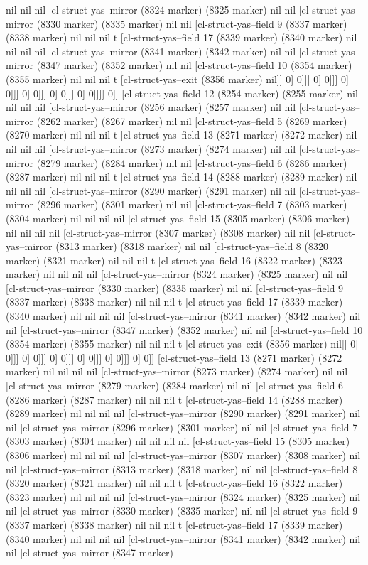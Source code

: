 {{nil nil nil [cl-struct-yas--mirror (8324 marker) (8325 marker) nil nil [cl-struct-yas--mirror (8330 marker) (8335 marker) nil nil [cl-struct-yas--field 9 (8337 marker) (8338 marker) nil nil nil t [cl-struct-yas--field 17 (8339 marker) (8340 marker) nil nil nil nil [cl-struct-yas--mirror (8341 marker) (8342 marker) nil nil [cl-struct-yas--mirror (8347 marker) (8352 marker) nil nil [cl-struct-yas--field 10 (8354 marker) (8355 marker) nil nil nil t [cl-struct-yas--exit (8356 marker) nil]] 0] 0]]] 0] 0]]] 0] 0]]] 0] 0]]] 0] 0]]] 0] 0]]]] 0]] [cl-struct-yas--field 12 (8254 marker) (8255 marker) nil nil nil nil [cl-struct-yas--mirror (8256 marker) (8257 marker) nil nil [cl-struct-yas--mirror (8262 marker) (8267 marker) nil nil [cl-struct-yas--field 5 (8269 marker) (8270 marker) nil nil nil t [cl-struct-yas--field 13 (8271 marker) (8272 marker) nil nil nil nil [cl-struct-yas--mirror (8273 marker) (8274 marker) nil nil [cl-struct-yas--mirror (8279 marker) (8284 marker) nil nil [cl-struct-yas--field 6 (8286 marker) (8287 marker) nil nil nil t [cl-struct-yas--field 14 (8288 marker) (8289 marker) nil nil nil nil [cl-struct-yas--mirror (8290 marker) (8291 marker) nil nil [cl-struct-yas--mirror (8296 marker) (8301 marker) nil nil [cl-struct-yas--field 7 (8303 marker) (8304 marker) nil nil nil nil [cl-struct-yas--field 15 (8305 marker) (8306 marker) nil nil nil nil [cl-struct-yas--mirror (8307 marker) (8308 marker) nil nil [cl-struct-yas--mirror (8313 marker) (8318 marker) nil nil [cl-struct-yas--field 8 (8320 marker) (8321 marker) nil nil nil t [cl-struct-yas--field 16 (8322 marker) (8323 marker) nil nil nil nil [cl-struct-yas--mirror (8324 marker) (8325 marker) nil nil [cl-struct-yas--mirror (8330 marker) (8335 marker) nil nil [cl-struct-yas--field 9 (8337 marker) (8338 marker) nil nil nil t [cl-struct-yas--field 17 (8339 marker) (8340 marker) nil nil nil nil [cl-struct-yas--mirror (8341 marker) (8342 marker) nil nil [cl-struct-yas--mirror (8347 marker) (8352 marker) nil nil [cl-struct-yas--field 10 (8354 marker) (8355 marker) nil nil nil t [cl-struct-yas--exit (8356 marker) nil]] 0] 0]]] 0] 0]]] 0] 0]]] 0] 0]]] 0] 0]]] 0] 0]] [cl-struct-yas--field 13 (8271 marker) (8272 marker) nil nil nil nil [cl-struct-yas--mirror (8273 marker) (8274 marker) nil nil [cl-struct-yas--mirror (8279 marker) (8284 marker) nil nil [cl-struct-yas--field 6 (8286 marker) (8287 marker) nil nil nil t [cl-struct-yas--field 14 (8288 marker) (8289 marker) nil nil nil nil [cl-struct-yas--mirror (8290 marker) (8291 marker) nil nil [cl-struct-yas--mirror (8296 marker) (8301 marker) nil nil [cl-struct-yas--field 7 (8303 marker) (8304 marker) nil nil nil nil [cl-struct-yas--field 15 (8305 marker) (8306 marker) nil nil nil nil [cl-struct-yas--mirror (8307 marker) (8308 marker) nil nil [cl-struct-yas--mirror (8313 marker) (8318 marker) nil nil [cl-struct-yas--field 8 (8320 marker) (8321 marker) nil nil nil t [cl-struct-yas--field 16 (8322 marker) (8323 marker) nil nil nil nil [cl-struct-yas--mirror (8324 marker) (8325 marker) nil nil [cl-struct-yas--mirror (8330 marker) (8335 marker) nil nil [cl-struct-yas--field 9 (8337 marker) (8338 marker) nil nil nil t [cl-struct-yas--field 17 (8339 marker) (8340 marker) nil nil nil nil [cl-struct-yas--mirror (8341 marker) (8342 marker) nil nil [cl-struct-yas--mirror (8347 marker) }}
